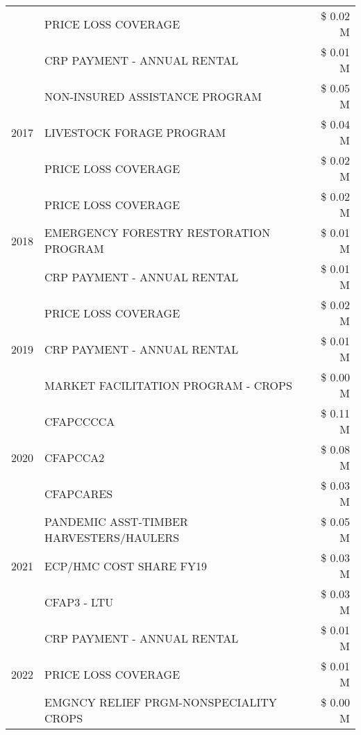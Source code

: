 \begin{tabular}{llr}
 & PRICE LOSS COVERAGE & \$ 0.02 M \\
 & CRP PAYMENT - ANNUAL RENTAL & \$ 0.01 M \\
\cline{1-3}
\multirow[t]{3}{*}{2017} & NON-INSURED ASSISTANCE PROGRAM & \$ 0.05 M \\
 & LIVESTOCK FORAGE PROGRAM & \$ 0.04 M \\
 & PRICE LOSS COVERAGE & \$ 0.02 M \\
\cline{1-3}
\multirow[t]{3}{*}{2018} & PRICE LOSS COVERAGE & \$ 0.02 M \\
 & EMERGENCY FORESTRY RESTORATION PROGRAM & \$ 0.01 M \\
 & CRP PAYMENT - ANNUAL RENTAL & \$ 0.01 M \\
\cline{1-3}
\multirow[t]{3}{*}{2019} & PRICE LOSS COVERAGE & \$ 0.02 M \\
 & CRP PAYMENT - ANNUAL RENTAL & \$ 0.01 M \\
 & MARKET FACILITATION PROGRAM - CROPS & \$ 0.00 M \\
\cline{1-3}
\multirow[t]{3}{*}{2020} & CFAPCCCCA & \$ 0.11 M \\
 & CFAPCCA2 & \$ 0.08 M \\
 & CFAPCARES & \$ 0.03 M \\
\cline{1-3}
\multirow[t]{3}{*}{2021} & PANDEMIC ASST-TIMBER HARVESTERS/HAULERS & \$ 0.05 M \\
 & ECP/HMC COST SHARE FY19 & \$ 0.03 M \\
 & CFAP3 - LTU & \$ 0.03 M \\
\cline{1-3}
\multirow[t]{3}{*}{2022} & CRP PAYMENT - ANNUAL RENTAL & \$ 0.01 M \\
 & PRICE LOSS COVERAGE & \$ 0.01 M \\
 & EMGNCY RELIEF PRGM-NONSPECIALITY CROPS & \$ 0.00 M \\
\cline{1-3}
\bottomrule
\end{tabular}
